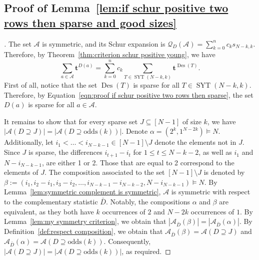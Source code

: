 \documentclass[ALCO]{cedram}
\newcommand{\Des}{\operatorname{Des}}
\newcommand{\Syt}{\operatorname{SYT}}
\newcommand{\Q}{\mathcal{Q}}
\newcommand{\A}{\mathcal{A}}
\newcommand{\odds}{\mathrm{odds}}
\begin{document}
\subsection{Proof of Lemma~\ref{lem:if schur positive two rows then sparse and good sizes}}
\label{subsec:proof lemma if schur positive two rows then sparse and good sizes}
\begin{proof}[\unskip\nopunct]
    The set $\A$ is symmetric, and its Schur expansion is $\Q_{D}(\A) = \sum_{k=0}^n c_k s_{N-k,k}$. Therefore, by Theorem~\ref{thm:criterion schur positive young}, we have
    \begin{equation}\label{eqn:proof if schur positive two rows then sparse}
        \sum_{a \in \A} \boldsymbol{t}^{D(a)} = \sum_{k=0}^n c_k \sum_{T \in \Syt(N-k,k)} \boldsymbol{t}^{\Des(T)}.
    \end{equation}
    First of all, notice that the set $\Des(T)$ is sparse for all $T \in \Syt(N-k,k)$. Therefore, by Equation~\eqref{eqn:proof if schur positive two rows then sparse}, the set $D(a)$ is sparse for all $a \in \A$.
    
    It remains to show that for every sparse set $J \subseteq [N-1]$ of size $k$, we have $\left|\A(D \supseteq J)\right| = \left|\A(D \supseteq \odds(k))\right|$. Denote $\alpha = (2^k,1^{N-2k}) \vDash N$. Additionally, let $i_1 < \dots < i_{N-k-1} \in [N-1]\setminus J$ denote the elements not in $J$. Since $J$ is sparse, the differences $i_{t+1} - i_t$ for $1 \le t \le N-k-2$, as well as $i_1$ and $N - i_{N-k-1}$, are either 1 or 2. Those that are equal to 2 correspond to the elements of $J$. The composition associated to the set $[N-1]\setminus J$ is denoted by $\beta := (i_1, i_2 - i_1, i_3 -i_2, \dots, i_{N-k-1} - i_{N-k-2}, N-i_{N-k-1}) \vDash N$. By Lemma~\ref{lem:symmetric complement is symmetric}, $\A$ is symmetric with respect to the complementary statistic $\bar{D}$. Notably, the compositions $\alpha$ and $\beta$ are equivalent, as they both have $k$ occurrences of $2$ and $N-2k$ occurrences of $1$. By Lemma~\ref{lem:my symmetry criterion}, we obtain that $|\A_{\bar{D}}(\beta)| = |\A_{\bar{D}}(\alpha)|$. By Definition~\ref{def:respect composition}, we obtain that $\A_{\bar{D}}(\beta) = \A(D \supseteq J)$ and $\A_{\bar{D}}(\alpha) = \A(D \supseteq \odds(k))$. Consequently, $|\A(D \supseteq J)| = |\A(D \supseteq \odds(k))|$, as required.
\end{proof}
\end{document}
